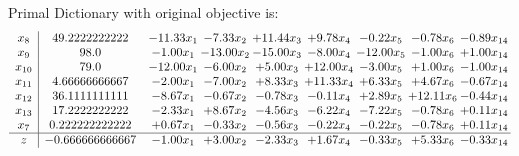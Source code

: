 \documentclass[9pt]{article}
\begin{document}
Primal Dictionary with original objective is:
\[\begin{array}{c| c c@{\hskip 2pt} c@{\hskip 2pt} c@{\hskip 2pt} c@{\hskip 2pt} c@{\hskip 2pt} c@{\hskip 2pt} c@{\hskip 2pt} }
 x_{8}   &  49.2222222222 & -11.33 x_{1} & -7.33 x_{2} & + 11.44 x_{3} & +  9.78 x_{4} & -0.22 x_{5} & -0.78 x_{6} & -0.89 x_{14}\\
 x_{9}   &  98.0 & -1.00 x_{1} & -13.00 x_{2} & -15.00 x_{3} & -8.00 x_{4} & -12.00 x_{5} & -1.00 x_{6} & +  1.00 x_{14}\\
 x_{10}   &  79.0 & -12.00 x_{1} & -6.00 x_{2} & +  5.00 x_{3} & + 12.00 x_{4} & -3.00 x_{5} & +  1.00 x_{6} & -1.00 x_{14}\\
 x_{11}   &  4.66666666667 & -2.00 x_{1} & -7.00 x_{2} & +  8.33 x_{3} & + 11.33 x_{4} & +  6.33 x_{5} & +  4.67 x_{6} & -0.67 x_{14}\\
 x_{12}   &  36.1111111111 & -8.67 x_{1} & -0.67 x_{2} & -0.78 x_{3} & -0.11 x_{4} & +  2.89 x_{5} & + 12.11 x_{6} & -0.44 x_{14}\\
 x_{13}   &  17.2222222222 & -2.33 x_{1} & +  8.67 x_{2} & -4.56 x_{3} & -6.22 x_{4} & -7.22 x_{5} & -0.78 x_{6} & +  0.11 x_{14}\\
 x_{7}   &  0.222222222222 & +  0.67 x_{1} & -0.33 x_{2} & -0.56 x_{3} & -0.22 x_{4} & -0.22 x_{5} & -0.78 x_{6} & +  0.11 x_{14}\\
\hline
z    &  -0.666666666667 & -1.00 x_{1} & +  3.00 x_{2} & -2.33 x_{3} & +  1.67 x_{4} & -0.33 x_{5} & +  5.33 x_{6} & -0.33 x_{14}\\
\end{array}\]
\end{document}
